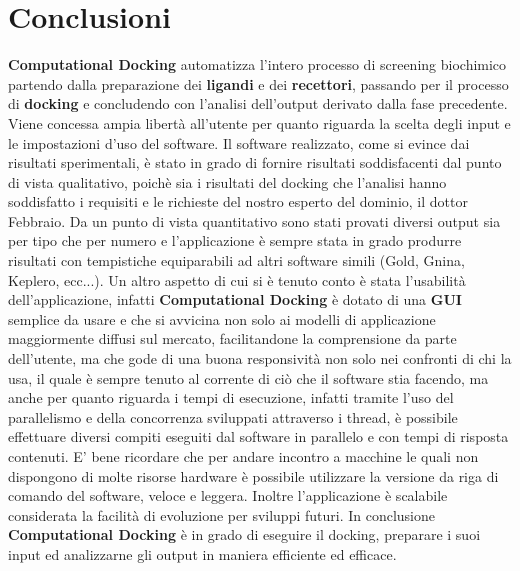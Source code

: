 \section{Conclusioni}
\textbf{Computational Docking} automatizza l'intero processo di screening biochimico partendo dalla preparazione dei \textbf{ligandi} e dei \textbf{recettori}, passando per il processo di \textbf{docking} e concludendo con l'analisi dell'output derivato dalla fase precedente.\newline
Viene concessa ampia libertà all'utente per quanto riguarda la scelta degli input e le impostazioni d'uso del software.
Il software realizzato, come si evince dai risultati sperimentali, è stato in grado di fornire risultati soddisfacenti dal punto di vista qualitativo, poichè sia i risultati del docking che l'analisi hanno soddisfatto i requisiti e le richieste del nostro esperto del dominio, il dottor Febbraio. Da un punto di vista quantitativo sono stati provati diversi output sia per tipo che per numero e l'applicazione è sempre stata in grado produrre risultati con tempistiche equiparabili ad altri software simili (Gold, Gnina, Keplero, ecc...).\newline
Un altro aspetto di cui si è tenuto conto è stata l'usabilità dell'applicazione, infatti \textbf{Computational Docking} è dotato di una \textbf{GUI} semplice da usare e che si avvicina non solo ai modelli di applicazione maggiormente diffusi sul mercato, facilitandone la comprensione da parte dell'utente, ma che gode di una buona responsività non solo nei confronti di chi la usa, il quale è sempre tenuto al corrente di ciò che il software stia facendo, ma anche per quanto riguarda i tempi di esecuzione, infatti tramite l'uso del parallelismo e della concorrenza sviluppati attraverso i thread, è possibile effettuare diversi compiti eseguiti dal software in parallelo e con tempi di risposta contenuti. E' bene ricordare che per andare incontro a macchine le quali non dispongono di molte risorse hardware è possibile utilizzare la versione da riga di comando del software, veloce e leggera.\newline
Inoltre l'applicazione è scalabile considerata la facilità di evoluzione per sviluppi futuri.
In conclusione \textbf{Computational Docking} è in grado di eseguire il docking, preparare i suoi input ed analizzarne gli output in maniera efficiente ed efficace.

